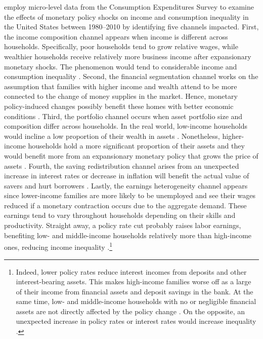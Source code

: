 \documentclass[11pt,letterpaper]{article}
\begin{document}
\citet{Coibion2017} employ micro-level data from the Consumption Expenditures Survey to examine the effects of monetary policy shocks on income and consumption inequality in the United States between 1980--2010 by identifying five channels impacted. First, the income composition channel appears when income is different across households. Specifically, poor households tend to grow relative wages, while wealthier households receive relatively more business income after expansionary monetary shocks. The phenomenon would tend to considerable income and consumption inequality \cite{Andersen2020, Gornemann2016}. Second, the financial segmentation channel works on the assumption that families with higher income and wealth attend to be more connected to the change of money supplies in the market. Hence, monetary policy-induced changes possibly benefit these homes with better economic conditions \cite{Williamson2008}. Third, the portfolio channel occurs when asset portfolio size and composition differ across households. In the real world, low-income households would incline a low proportion of their wealth in assets \cite{Lenza2018}. Nonetheless, higher-income households hold a more significant proportion of their assets and they would benefit more from an expansionary monetary policy that grows the price of assets \cite{Albert2020}. Fourth, the saving redistribution channel arises from an unexpected increase in interest rates or decrease in inflation will benefit the actual value of savers and hurt borrowers \cite{Doepke2006}. Lastly, the earnings heterogeneity channel appears since lower-income families are more likely to be unemployed and see their wages reduced if a monetary contraction occurs due to the aggregate demand. These earnings tend to vary throughout households depending on their skills and productivity. Straight away, a policy rate cut probably raises labor earnings, benefiting low- and middle-income households relatively more than high-income ones, reducing income inequality \cite{Auclert2019}.\footnote{Indeed, lower policy rates reduce interest incomes from deposits and other interest-bearing assets. This makes high-income families worse off as a large of their income from financial assets and deposit savings in the bank. At the same time, low- and middle-income households with no or negligible financial assets are not directly affected by the policy change \cite{Amberg2021}. On the opposite, an unexpected increase in policy rates or interest rates would increase inequality \cite{Furceri2016}.}
\end{document}
